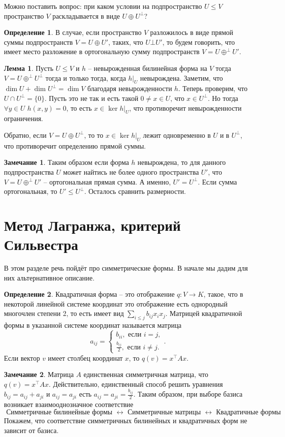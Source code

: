\documentclass[10pt,a4paper,oneside]{book} %
\theoremstyle{definition}
\newtheorem*{rem}{Замечание}
\newtheorem*{defn}{Определение}
\newtheorem{lem}{Лемма}
\def\dfn{\begin{defn}}
\def\edfn{\end{defn}}
\def\lm{\begin{lem}}
\def\elm{\end{lem}}
\def\rm{\begin{rem}}
\def\erm{\end{rem}}
\begin{document}
Можно поставить вопрос: при каком условии на подпространство $U\leq V$ пространство $V$ раскладывается в виде $U\oplus U^{\bot}$?

\dfn В случае, если пространство $V$ разложилось в виде прямой суммы подпространств $V=U\oplus U'$, таких, что $U \bot U'$, то будем говорить, что имеет место разложение в ортогональную сумму подпространств  $V=U\oplus^{\bot} U'$.
\edfn

\lm Пусть $U\leq V$  и $h$ -- невырожденная билинейная форма на $V$ тогда $V=U\oplus^{\bot} U^{\bot}$ тогда и только тогда, когда $h|_{U}$ невырождена.
\proof Заметим, что $\dim U + \dim U^{\bot}= \dim V$ благодаря невырожденности $h$. Теперь проверим, что $U \cap U^{\bot}= \{0\}$. Пусть это не так и есть такой $0\neq x \in U$, что $x \in U^{\bot}$. Но тогда $\forall y \in U$ $h(x,y)=0$, то есть $x\in \ker h|_{U}$, что противоречит невырожденности ограничения. 

Обратно, если $V=U \oplus U^{\bot}$, то то  $x\in \ker h|_{U}$ лежит одновременно в $U$ и в $U^{\bot}$, что противоречит определению прямой суммы.
\endproof
\elm

\rm Таким образом если форма $h$ невырождена, то для данного подпространства $U$ может найтись не более одного пространства $U'$, что $V=U\oplus^{\bot} U'$ -- ортогональная прямая сумма. А именно, $U'=U^{\bot}$.
\proof Если сумма ортогональная, то $U' \leq U^{\bot}$. Осталось сравнить размерности. 
\endproof
\erm



\section{Метод Лагранжа, критерий Сильвестра}


В этом разделе речь пойдёт про симметрические формы. В начале мы дадим для них альтернативное описание.

\dfn Квадратичная форма -- это отображение $q\colon V \to K$, такое, что в некоторой линейной системе координат это отображение есть однородный многочлен степени 2, то есть имеет вид $\sum_{i\leq j} b_{ij} x_i x_j$. Матрицей квадратичной формы в указанной системе координат называется матрица $$a_{ij}=\begin{cases} b_{ii}, \text{ если $i=j$},\\
\frac{b_{ij}}{2}, \text{ если $i\neq j$}.
\end{cases}.$$
Если вектор $v$ имеет столбец координат $x$, то $q(v)=x^{\top}Ax$.
\edfn

\rm Матрица $A$ единственная симметричная матрица, что $q(v)=x^{\top} A x$. Действительно, единственный способ решить уравнения $b_{ij}=a_{ij}+a_{ji}$ и $a_{ij}=a_{ji}$  есть $a_{ij}=a_{ji}=\frac{b_{ij}}{2}$.
Таким образом, при выборе базиса возникает взаимооднозначное соответствие 
$$\text{ Симметричные билинейные формы } \leftrightarrow \text{ Симметричные матрицы } \leftrightarrow \text{ Квадратичные формы } $$
Покажем, что соответствие симметричных билинейных и квадратичных форм не зависит от базиса.
\erm
\end{document}
